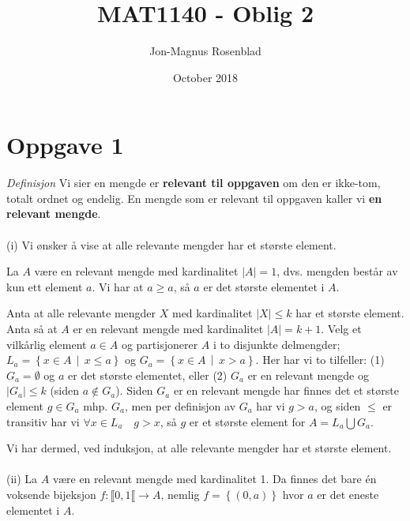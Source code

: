 \documentclass{article}[norsk]
\title{MAT1140 - Oblig 2}
\author{Jon-Magnus Rosenblad}
\date{October 2018}
\begin{document}
\maketitle

\section*{Oppgave 1}
\textit{Definisjon} Vi sier en mengde er \textbf{relevant til oppgaven} om den er ikke-tom, totalt ordnet og endelig. En mengde som er relevant til oppgaven kaller vi \textbf{en relevant mengde}.
\\\\
(i) Vi ønsker å vise at alle relevante mengder har et største element. 

La $A$ være en relevant mengde med kardinalitet $|A| = 1$, dvs. mengden består av kun ett element $a$. Vi har at $a\geq a$, så $a$ er det største elementet i $A$. 

Anta at alle relevante mengder $X$ med kardinalitet $|X|\leq k$ har et største element. Anta så at $A$ er en relevant mengde med kardinalitet $|A| = k+1$. Velg et vilkårlig element $a\in A$ og partisjonerer $A$ i to disjunkte delmengder; $L_a=\left\{x\in A\, \middle|\, x\leq a\right\}$ og $G_a=\left\{x\in A\,\middle|\,x>a\right\}$. Her har vi to tilfeller: (1) $G_a=\emptyset$ og $a$ er det største elementet, eller (2) $G_a$ er en relevant mengde og $|G_a|\leq k$ (siden $a\notin G_a$). Siden $G_a$ er en relevant mengde har finnes det et største element $g\in G_a$ mhp. $G_a$, men per definisjon av $G_a$ har vi $g>a$, og siden $\leq$ er transitiv har vi $\forall x\in L_a\quad g>x$, så $g$ er et største element for $A=L_a\bigcup G_a$. 

  Vi har dermed, ved induksjon, at alle relevante mengder har et største element.
\\\\
(ii) %
La $A$ være en relevant mengde med kardinalitet 1. Da finnes det bare én voksende bijeksjon $f:\llbracket  0,1\llbracket\rightarrow A$, nemlig $f=\left\{(0,a)\right\}$ hvor $a$ er det eneste elementet i $A$.
\end{document}
